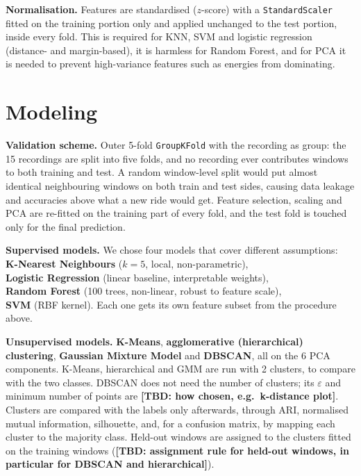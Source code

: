 \documentclass[10pt,a4paper]{article}
\newcommand{\tbd}[1]{\textbf{\textcolor{red!70!black}{[TBD: #1]}}}
\begin{document}
\textbf{Normalisation.} Features are standardised ($z$-score) with a \texttt{StandardScaler} fitted on the training portion only and applied unchanged to the test portion, inside every fold. This is required for KNN, SVM and logistic regression (distance- and margin-based), it is harmless for Random Forest, and for PCA it is needed to prevent high-variance features such as energies from dominating.

\section{Modeling}

\textbf{Validation scheme.} Outer 5-fold \texttt{GroupKFold} with the recording as group: the 15 recordings are split into five folds, and no recording ever contributes windows to both training and test. A random window-level split would put almost identical neighbouring windows on both train and test sides, causing data leakage and accuracies above what a new ride would get. Feature selection, scaling and PCA are re-fitted on the training part of every fold, and the test fold is touched only for the final prediction. 

\textbf{Supervised models.} We chose four models that cover different assumptions: \\ \textbf{K-Nearest Neighbours} ($k=5$, local, non-parametric),\\  \textbf{Logistic Regression} (linear baseline, interpretable weights),\\  \textbf{Random Forest} (100 trees, non-linear, robust to feature scale), \\ \textbf{SVM} (RBF kernel). Each one gets its own feature subset from the procedure above.

\textbf{Unsupervised models.} \textbf{K-Means}, \textbf{agglomerative (hierarchical) clustering}, \textbf{Gaussian Mixture Model} and \textbf{DBSCAN}, all on the 6 PCA components. K-Means, hierarchical and GMM are run with 2 clusters, to compare with the two classes. DBSCAN does not need the number of clusters; its $\varepsilon$ and minimum number of points are \tbd{how chosen, e.g.\ k-distance plot}. Clusters are compared with the labels only afterwards, through ARI, normalised mutual information, silhouette, and, for a confusion matrix, by mapping each cluster to the majority class. Held-out windows are assigned to the clusters fitted on the training windows (\tbd{assignment rule for held-out windows, in particular for DBSCAN and hierarchical}).
\end{document}
